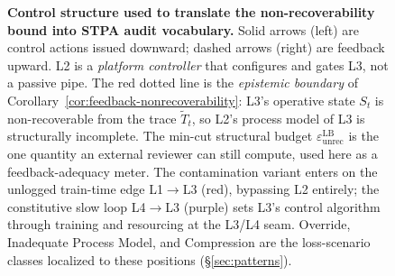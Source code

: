 \begin{figure}[t]
{%
}
\caption{\textbf{Control structure used to translate the non-recoverability bound into STPA audit vocabulary.} Solid arrows (left) are control actions issued downward; dashed arrows (right) are feedback upward. L2 is a \emph{platform controller} that configures and gates L3, not a passive pipe. The red dotted line is the \emph{epistemic boundary} of Corollary~\ref{cor:feedback-nonrecoverability}: L3's operative state $S_t$ is non-recoverable from the trace $\tilde T_t$, so L2's process model of L3 is structurally incomplete. The min-cut structural budget $\varepsilon_{\mathrm{unrec}}^{\mathrm{LB}}$ is the one quantity an external reviewer can still compute, used here as a feedback-adequacy meter. The contamination variant enters on the unlogged train-time edge L1$\to$L3 (red), bypassing L2 entirely; the constitutive slow loop L4$\to$L3 (purple) sets L3's control algorithm through training and resourcing at the L3/L4 seam. Override, Inadequate Process Model, and Compression are the loss-scenario classes localized to these positions (\S\ref{sec:patterns}).}
\label{fig:cascade}
\end{figure}
